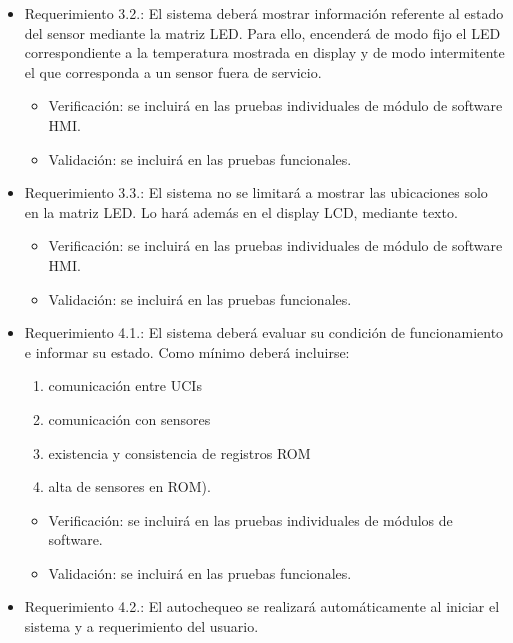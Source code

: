 \documentclass[
11pt, %
codirector, %
]{charter}
\begin{document}
\begin{itemize}
\item Requerimiento 3.2.: El sistema deberá mostrar información referente al estado del sensor mediante la matriz LED. Para ello, encenderá de modo fijo el LED correspondiente a la temperatura mostrada en display y de modo intermitente el que corresponda a un sensor fuera de servicio. 
\begin{itemize}
	\item Verificación: se incluirá en las pruebas individuales de módulo de software HMI. 
	\item Validación: se incluirá en las pruebas funcionales.
\end{itemize}
\item Requerimiento 3.3.: El sistema no se limitará a mostrar las ubicaciones solo en la matriz LED. Lo hará además en el display LCD, mediante texto.  
\begin{itemize}
	\item Verificación: se incluirá en las pruebas individuales de módulo de software HMI. 
	\item Validación: se incluirá en las pruebas funcionales.
\end{itemize}
\item Requerimiento 4.1.: El sistema deberá evaluar su condición de funcionamiento e informar su estado. Como mínimo deberá incluirse:
\begin{enumerate}
\renewcommand{\theenumi}{\alph{enumi}} %
	\item comunicación entre UCIs
	\item comunicación con sensores
	\item existencia y consistencia de registros ROM
	\item alta de sensores en ROM).
\end{enumerate}  
\begin{itemize}
	\item Verificación: se incluirá en las pruebas individuales de módulos de software. 
	\item Validación: se incluirá en las pruebas funcionales.
\end{itemize}
\item Requerimiento 4.2.: El autochequeo se realizará automáticamente al iniciar el sistema y a requerimiento del usuario.  

\end{itemize}
\end{document}
